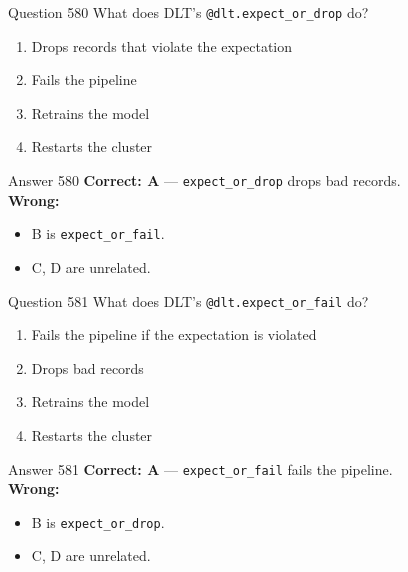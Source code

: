 \documentclass[aspectratio=169,11pt]{beamer}
\begin{document}
	\begin{frame}{Question 580}
		What does DLT's \texttt{@dlt.expect\_or\_drop} do?
		\begin{enumerate}[label=\Alph*.]
			\item Drops records that violate the expectation
			\item Fails the pipeline
			\item Retrains the model
			\item Restarts the cluster
		\end{enumerate}
	\end{frame}
	\begin{frame}{Answer 580}
		\textbf{Correct: A} --- \texttt{expect\_or\_drop} drops bad records.\\
		\vspace{0.5em}
		\textbf{Wrong:}
		\begin{itemize}
			\item B is \texttt{expect\_or\_fail}.
			\item C, D are unrelated.
		\end{itemize}
	\end{frame}
	
	\begin{frame}{Question 581}
		What does DLT's \texttt{@dlt.expect\_or\_fail} do?
		\begin{enumerate}[label=\Alph*.]
			\item Fails the pipeline if the expectation is violated
			\item Drops bad records
			\item Retrains the model
			\item Restarts the cluster
		\end{enumerate}
	\end{frame}
	\begin{frame}{Answer 581}
		\textbf{Correct: A} --- \texttt{expect\_or\_fail} fails the pipeline.\\
		\vspace{0.5em}
		\textbf{Wrong:}
		\begin{itemize}
			\item B is \texttt{expect\_or\_drop}.
			\item C, D are unrelated.
		\end{itemize}
	\end{frame}
	
\end{document}
